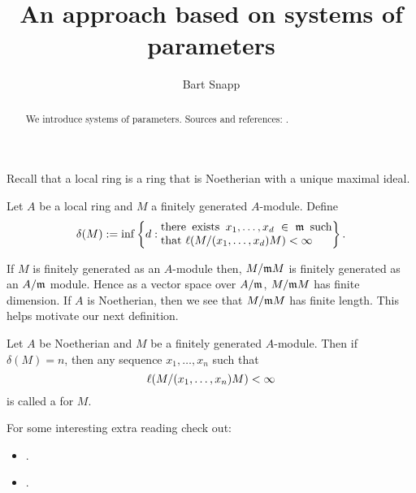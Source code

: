 \documentclass{ximera}
\author{Bart Snapp}
\title{An approach based on systems of parameters}
\begin{document}
\begin{abstract}
  We introduce systems of parameters. Sources and references:
  \cite{sD2008}.
\end{abstract}
\maketitle


Recall that a local ring is a ring that is Noetherian with a unique maximal ideal.

\begin{definition}
  Let $A$ be a local ring and $M$ a finitely generated $A$-module. Define
  \[
  \delta(M) := \inf\left\{d:
  \begin{minipage}{35ex}
    there exists $x_1,\dots, x_d\in \m$ such that $\l(M/(x_1,\dots,x_d)M)<\infty$
  \end{minipage} \right\}.
  \]
\end{definition}

If $M$ is finitely generated as an $A$-module then, $M/\mathfrak{m} M$ is
finitely generated as an $A/\mathfrak{m}$ module. Hence as a vector space over
$A/\mathfrak{m}$, $M/\mathfrak{m} M$ has finite dimension. If $A$ is Noetherian, then we
see that $M/\mathfrak{m} M$ has finite length. This helps motivate our next
definition.

\begin{definition}
  Let $A$ be Noetherian and $M$ be a finitely generated
  $A$-module. Then if $\delta(M) = n$, then any sequence $x_1,\dots, x_n$
  such that
  \[
  \l(M/(x_1,\dots,x_n)M)<\infty\index{finite length}
  \]
  is called a  for $M$. 
\end{definition}





For some interesting extra reading check out:
\begin{itemize}

\item {}.
\item {}.
\end{itemize}
\end{document}
